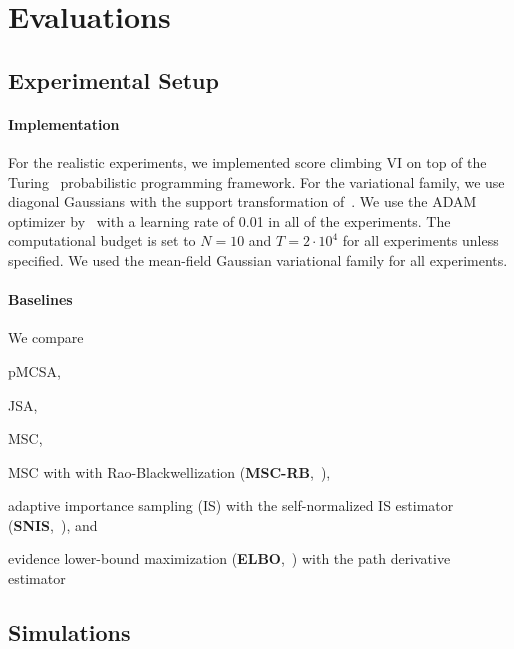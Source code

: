 \vspace{-0.05in}
\section{Evaluations}\label{section:eval}

\vspace{-0.05in}
\subsection{Experimental Setup}
\vspace{-0.05in}
\paragraph{Implementation}
For the realistic experiments, we implemented score climbing VI on top of the Turing~\citep{ge2018t} probabilistic programming framework.
For the variational family, we use diagonal Gaussians with the support transformation of~\citet{JMLR:v18:16-107}.
We use the ADAM optimizer by~\citet{kingma_adam_2015} with a learning rate of 0.01 in all of the experiments.
The computational budget is set to \(N=10\) and \(T=2\cdot10^4\) for all experiments unless specified.
We used the mean-field Gaussian variational family for all experiments.

\vspace{-0.1in}
\paragraph{Baselines}
We compare
\begin{enumerate*}[label=\textbf{(\roman*)}]
  \item pMCSA,
  \item JSA,
  \item MSC,
  \item MSC with with Rao-Blackwellization (\textbf{MSC-RB},~\citealt{NEURIPS2020_b2070693}),
  \item adaptive importance sampling (IS) with the self-normalized IS estimator (\textbf{SNIS},~\citealt{robert_monte_2004}), and
  \item evidence lower-bound maximization (\textbf{ELBO},~\citealt{pmlr-v33-ranganath14, JMLR:v18:16-107}) with the path derivative estimator~\citep{NIPS2017_e91068ff}
\end{enumerate*}

\vspace{-0.1in}
\subsection{Simulations}\label{section:simulation}
\vspace{-0.05in}
